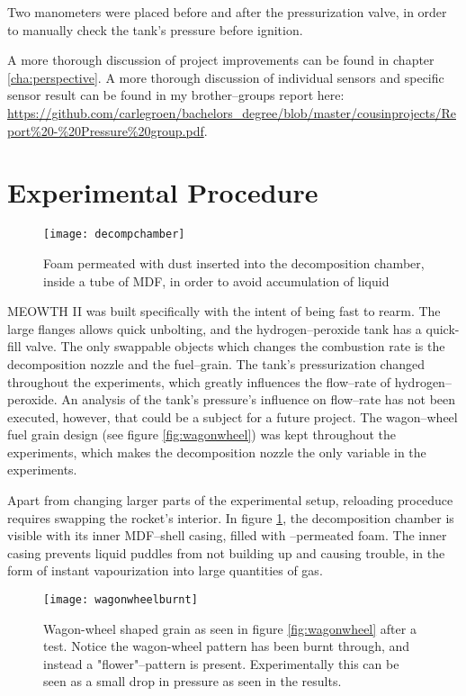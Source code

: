 	Two manometers were placed before and after the pressurization valve, in order to manually check the tank's pressure before ignition.

	A more thorough discussion of project improvements can be found in chapter \ref{cha:perspective}. A more thorough discussion of individual sensors and specific sensor result can be found in my brother--groups report here: \url{https://github.com/carlegroen/bachelors_degree/blob/master/cousinprojects/Report%20-%20Pressure%20group.pdf}.

	\section{Experimental Procedure}

	\begin{figure}
		\centering
		\texttt{[image: decompchamber]}
		\caption{Foam permeated with  dust inserted into the decomposition chamber, inside a tube of MDF, in order to avoid accumulation of liquid }
		\label{fig:kmno4foam2}
	\end{figure}

	MEOWTH II was built specifically with the intent of being fast to rearm. The large flanges allows quick unbolting, and the hydrogen--peroxide tank has a quick-fill valve. The only swappable objects which changes the combustion rate is the decomposition nozzle and the fuel--grain. The tank's pressurization changed throughout the experiments, which greatly influences the flow--rate of hydrogen--peroxide. An analysis of the tank's pressure's influence on flow--rate has not been executed, however, that could be a subject for a future project. The wagon--wheel fuel grain design (see figure \ref{fig:wagonwheel}) was kept throughout the experiments, which makes the decomposition nozzle the only variable in the experiments.

	Apart from changing larger parts of the experimental setup, reloading proceduce requires swapping the rocket's interior. In figure \ref{fig:kmno4foam2}, the decomposition chamber is visible with its inner MDF--shell casing, filled with --permeated foam. The inner casing prevents liquid puddles from not building up and causing trouble, in the form of instant vapourization into large quantities of gas.

	\begin{figure}
		\centering
		\texttt{[image: wagonwheelburnt]}
		\caption{Wagon-wheel shaped grain as seen in figure \ref{fig:wagonwheel} after a test. Notice the wagon-wheel pattern has been burnt through, and instead a "flower"--pattern is present. Experimentally this can be seen as a small drop in pressure as seen in the results.}
		\label{fig:burntgrain}
	\end{figure}

